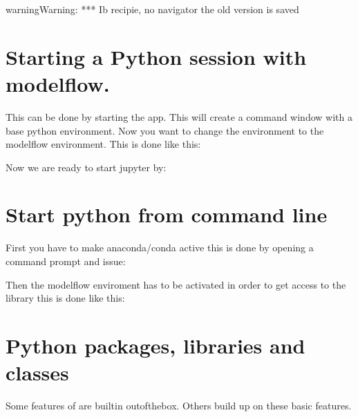 \documentclass[letterpaper,10pt,english]{jupyterBook}
\begin{document}
\begin{sphinxadmonition}{warning}{Warning:}
\sphinxAtStartPar
*** Ib recipie, no navigator the \sphinxhyphen{}old version is saved
\end{sphinxadmonition}


\section{Starting a Python session with modelflow.}
\label{\detokenize{content/04_PythonEssentials/PythonPandasDataframes:starting-a-python-session-with-modelflow}}
\sphinxAtStartPar
This can be done by starting the  app. This will create a command window with a base python environment. Now you want to change the environment to the modelflow environment. This is done like this:

\begin{sphinxVerbatim}[commandchars=\\\{\}]
  

\end{sphinxVerbatim}

\sphinxAtStartPar
Now we are ready to start jupyter by:

\begin{sphinxVerbatim}[commandchars=\\\{\}]
       
 
\end{sphinxVerbatim}


\section{Start python from command line}
\label{\detokenize{content/04_PythonEssentials/PythonPandasDataframes:start-python-from-command-line}}
\sphinxAtStartPar
First you have to make anaconda/conda active this is done by opening a command prompt and issue:
\begin{quote}
\end{quote}

\sphinxAtStartPar
Then the modelflow enviroment has to be activated in order to get access to the library this is done like this:


\section{Python  packages, libraries and classes}
\label{\detokenize{content/04_PythonEssentials/PythonPandasDataframes:python-packages-libraries-and-classes}}
\sphinxAtStartPar
Some features of  are built\sphinxhyphen{}in out\sphinxhyphen{}of\sphinxhyphen{}the\sphinxhyphen{}box.  Others build up on these basic features.
\end{document}
